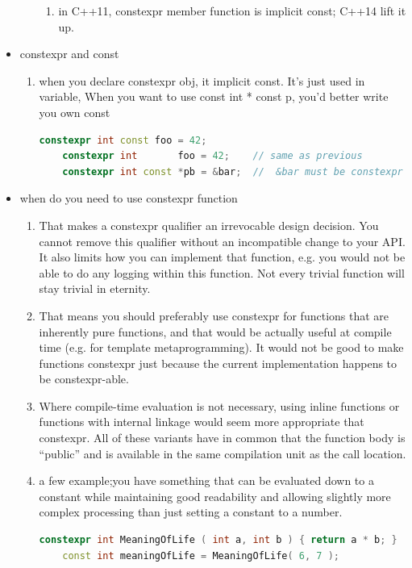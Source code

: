 \documentclass[a4paper,12pt,twoside]{book}
\begin{document}
\begin{itemize}
\begin{enumerate}
\begin{enumerate}
             \item in C++11, constexpr member function is implicit const; C++14 lift it up.
         \end{enumerate}
     \end{enumerate}

\item constexpr and const
\begin{enumerate}
    \item when you declare constexpr obj, it implicit const. It's just used in variable, When you want to use const int * const p, you'd better write you own const 
\begin{lstlisting}[frame=single, language=c++]
    constexpr int const foo = 42;
    constexpr int       foo = 42;    // same as previous
    constexpr int const *pb = &bar;  //  &bar must be constexpr
\end{lstlisting}

\end{enumerate}

\item when do you need to use constexpr function

\begin{enumerate}
    \item That makes a constexpr qualifier an irrevocable design decision. You cannot remove this qualifier without an incompatible change to your API. It also limits how you can implement that function, e.g. you would not be able to do any logging within this function. Not every trivial function will stay trivial in eternity.
    
    \item That means you should preferably use constexpr for functions that are inherently pure functions, and that would be actually useful at compile time (e.g. for template metaprogramming). It would not be good to make functions constexpr just because the current implementation happens to be constexpr-able.
    
    \item Where compile-time evaluation is not necessary, using inline functions or functions with internal linkage would seem more appropriate that constexpr. All of these variants have in common that the function body is “public” and is available in the same compilation unit as the call location.
    
    \item a few example;you have something that can be evaluated down to a constant while maintaining good readability and allowing slightly more complex processing than just setting a constant to a number.
    \begin{lstlisting}[frame=single, language=c++]
    constexpr int MeaningOfLife ( int a, int b ) { return a * b; }
    const int meaningOfLife = MeaningOfLife( 6, 7 );
\end{lstlisting}
    

\end{enumerate}
\end{itemize}
\end{document}
